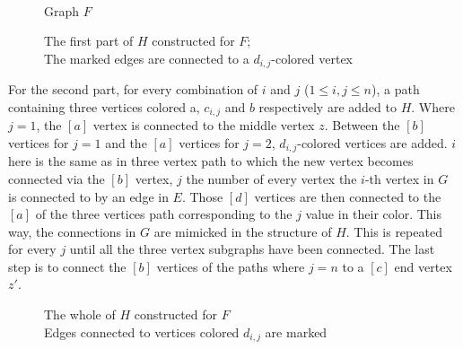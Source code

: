 \documentclass[12pt,a4paper]{article}
\begin{document}
\newline
\begin{figure}[h]
\begin{minipage}{0.2\linewidth}
	
	\caption{\\Graph $F$}
\end{minipage}
\begin{minipage}{0.8\linewidth}
	
	\caption{The first part of $H$ constructed for $F$; \\The marked edges are connected to a $d_{i,j}$-colored vertex}
\end{minipage}
\end{figure}
\newline
For the second part, for every combination of $i$ and $j$ ($1 \leq i, j \leq n$), a path containing three vertices colored a, $c_{i,j}$ and $b$ respectively are added to $H$. Where $j = 1$, the $[a]$ vertex is connected to the middle vertex $z$. Between the $[b]$ vertices for $j = 1$ and the $[a]$ vertices for $j = 2$, $d_{i,j}$-colored vertices are added. $i$ here is the same as in three vertex path to which the new vertex becomes connected via the $[b]$ vertex, $j$ the number of every vertex the $i$-th vertex in $G$ is connected to by an edge in $E$. Those $[d]$ vertices are then connected to the $[a]$ of the three vertices path corresponding to the $j$ value in their color. This way, the connections in $G$ are mimicked in the structure of $H$. This is repeated for every $j$ until all the three vertex subgraphs have been connected. The last step is to connect the $[b]$ vertices of the paths where $j = n$ to a $[c]$ end vertex $z'$. 
\begin{figure}[h]
	
	\caption{The whole of $H$ constructed for $F$ \\ Edges connected to vertices colored $d_{i,j}$ are marked}
\end{figure}
\newpage
\end{document}
